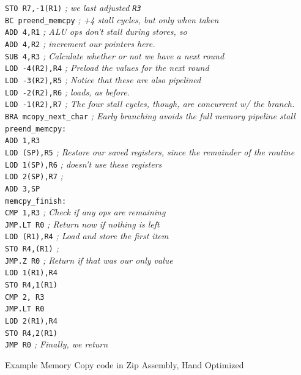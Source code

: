 \documentclass{gqtekspec}
\begin{document}
\begin{table}
\begin{center}
{{\begin{tabbing}
\>	{\tt STO  R7,-1(R1)}	\> {\em ; we last adjusted {\tt R3}}\\
\>	{\tt BC  preend\_memcpy} \> {\em ; +4 stall cycles, but only when taken}\\
\>	{\tt ADD  4,R1}	\> {\em ; ALU ops don't stall during stores, so}\\
\>	{\tt ADD  4,R2}	\> {\em ; increment our pointers here.} \\
\>	{\tt SUB  4,R3} \> {\em ; Calculate whether or not we have a next round}\\
\>	{\tt LOD  -4(R2),R4} \>	{\em ; Preload the values for the next round}\\
\>	{\tt LOD  -3(R2),R5}\>	{\em ; Notice that these are also pipelined}\\
\>	{\tt LOD  -2(R2),R6}\>	{\em ; loads, as before.}\\
\>	{\tt LOD  -1(R2),R7}\>  {\em ; The four stall cycles, though, are concurrent w/ the branch.}\\
\>	{\tt BRA  mcopy\_next\_char} \> {\em ; Early branching avoids the full memory pipeline stall} \\
{\tt preend\_memcpy:}\\
\>	{\tt ADD  1,R3}	\\
\>	{\tt LOD (SP),R5}  \> {\em ; Restore our saved registers, since the remainder of the routine}\\
\>	{\tt LOD 1(SP),R6} \> {\em ; doesn't use these registers}\\
\>	{\tt LOD 2(SP),R7} \> {\em ;}\\
\>	{\tt ADD 3,SP}	\\
{\tt memcpy\_finish:}\>\\
\>	{\tt CMP 1,R3} \> {\em ; Check if any ops are remaining }\\
\>	{\tt JMP.LT R0} \> {\em ; Return now if nothing is left}\\
\>	{\tt LOD (R1),R4} \> {\em ; Load and store the first item}\\
\>	{\tt STO R4,(R1)} \> {\em ;}\\
\>	{\tt JMP.Z R0}	\> {\em ; Return if that was our only value}\\
\>	{\tt LOD 1(R1),R4} \\
\>	{\tt STO R4,1(R1)}\\
\>	{\tt CMP 2, R3}\\
\>	{\tt JMP.LT R0}\\
\>	{\tt LOD 2(R1),R4} \\
\>	{\tt STO R4,2(R1)}\\
\>	{\tt JMP     R0} \> {\em ; Finally, we return}\\
\end{tabbing}}}
\caption{Example Memory Copy code in Zip Assembly, Hand Optimized}\label{tbl:memcp-opt}
\end{center}\end{table}
\end{document}

